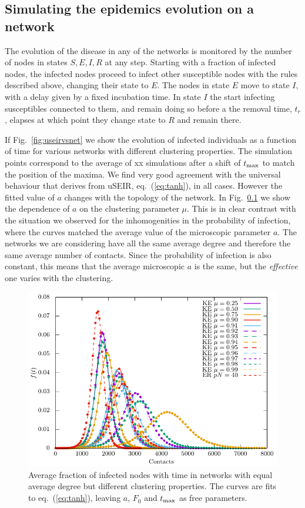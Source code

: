 \documentclass[a4paper,oneside,11pt]{article}
\begin{document}
\subsection{Simulating the epidemics evolution on a network}

The evolution of the disease in any of the networks is monitored by the number of nodes in states $S, E, I, R$ at any step. Starting with a fraction of  infected nodes, the infected nodes proceed to infect other susceptible nodes with the rules described above,  changing their state to $E$. The nodes in state $E$ move to state $I$, with a delay given by a fixed incubation time. In state $I$ the start infecting susceptibles connected to them, and remain doing so before a the removal time, $t_r$, elapses at which point they change state to $R$ and remain there.

If Fig.~\ref{fig:useirvsnet} we show the evolution of infected individuals as a function of time for various networks with different clustering properties. The simulation points correspond to the average of xx simulations after a shift of $t_{\rm max}$ to match the position of the maxima. We find very good agreement with the universal behaviour that derives from uSEIR, eq.~(\ref{eq:tanh}), in all cases. However the fitted value of $a$ changes with the topology of the network. In Fig.~\ref{} we show the dependence of
$a$ on the clustering parameter $\mu$. This is in clear contrast with the situation we observed for the inhomogenities in the probability of infection, where the curves matched the average value of the microscopic parameter $a$. The networks we are considering have all the same average degree and therefore the same average number of contacts. Since the probability of infection is also constant, this means that the average
microscopic $a$ is the same, but the {\it effective} one varies with the clustering.
\begin{figure}[htbp]
\centering
 \includegraphics[width=.8\linewidth]{uSEIR.pdf}
\caption{Average fraction of infected nodes with time in networks with equal average degree but different clustering properties. The curves are fits  to eq.~(\ref{eq:tanh}), leaving $a$, $F_0$ and $t_{\rm max}$ as free parameters. }
\end{figure}
\end{document}
